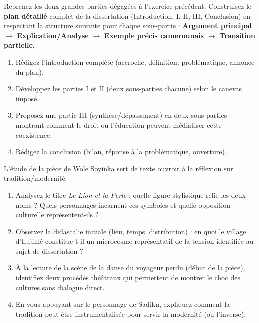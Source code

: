 \documentclass[11pt]{article}
\begin{document}
\begin{exercice}
Reprenez les deux grandes parties dégagées à l'exercice précédent. Construisez le \textbf{plan détaillé} complet de la dissertation (Introduction, I, II, III, Conclusion) en respectant la structure suivante pour chaque sous-partie : \textbf{Argument principal} $\rightarrow$ \textbf{Explication/Analyse} $\rightarrow$ \textbf{Exemple précis camerounais} $\rightarrow$ \textbf{Transition partielle}.
\begin{enumerate}
    \item Rédigez l'introduction complète (accroche, définition, problématique, annonce du plan).
    \item Développez les parties I et II (deux sous-parties chacune) selon le canevas imposé.
    \item Proposez une partie III (synthèse/dépassement) en deux sous-parties montrant comment le droit ou l'éducation peuvent médiatiser cette coexistence.
    \item Rédigez la conclusion (bilan, réponse à la problématique, ouverture).
\end{enumerate}
\end{exercice}

\begin{exercice}
L'étude de la pièce de Wole Soyinka sert de texte ouvroir à la réflexion sur tradition/modernité.
\begin{enumerate}
    \item Analysez le titre \textit{Le Lion et la Perle} : quelle figure stylistique relie les deux noms ? Quels personnages incarnent ces symboles et quelle opposition culturelle représentent-ils ?
    \item Observez la didascalie initiale (lieu, temps, distribution) : en quoi le village d'Ilujinlé constitue-t-il un microcosme représentatif de la tension identifiée au sujet de dissertation ?
    \item À la lecture de la scène de la \og danse du voyageur perdu \fg (début de la pièce), identifiez deux procédés théâtraux qui permettent de montrer le choc des cultures sans dialogue direct.
    \item En vous appuyant sur le personnage de Sadiku, expliquez comment la tradition peut être instrumentalisée pour servir la modernité (ou l'inverse).
\end{enumerate}
\end{exercice}
\end{document}
